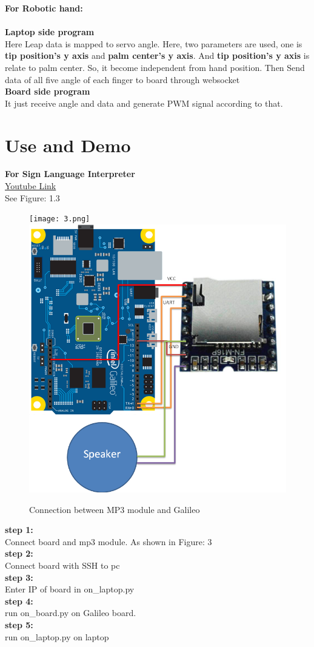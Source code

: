 \documentclass[a4paper,12pt,oneside]{book}
\begin{document}
\vspace{.3cm}
\textbf{For Robotic hand:}\\
\vspace{.3cm}\\
\textbf{Laptop side program}\\
Here Leap data is mapped to servo angle. Here, two parameters are used, one is \textbf{tip position's y axis} and \textbf{palm center's y axis}. And \textbf{tip position's y axis} is relate to palm center. So, it become independent from hand position. Then Send data of all five angle of each finger to board through websocket\\
\textbf{Board side program}\\
It just receive angle and data and generate PWM signal according to that.
\section{Use and Demo}
\textbf{For Sign Language Interpreter}\\
\href{https://youtu.be/sPYWe_E_F5w}{Youtube Link}\\
See Figure: 1.3\\
\begin{figure}
  \texttt{[image: 3.png]}
  \includegraphics[width=12cm]{5.png}
  \caption{Connection between MP3 module and Galileo}
\end{figure}
\textbf{step 1:}\\
Connect board and mp3 module. As shown in Figure: 3\\
\textbf{step 2:}\\
Connect board with SSH to pc\\
\textbf{step 3:}\\
Enter IP of board in on\_laptop.py\\
\textbf{step 4:}\\
run on\_board.py on Galileo board.\\
\textbf{step 5:}\\
run on\_laptop.py on laptop\\
\end{document}
